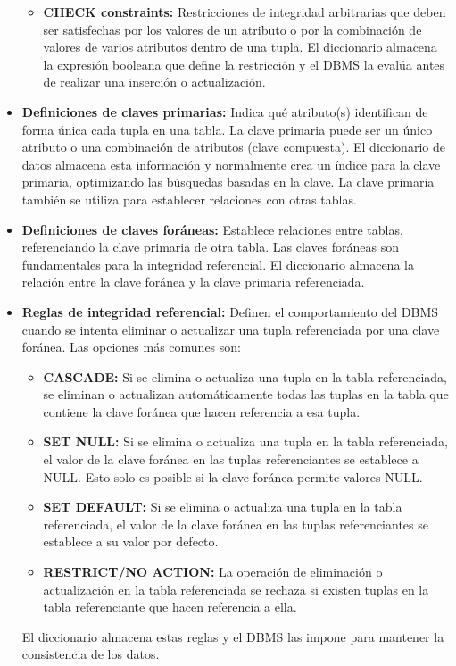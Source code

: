 \begin{itemize}
\begin{itemize}
        \item \textbf{CHECK constraints:} Restricciones de integridad arbitrarias que deben ser satisfechas por los valores de un atributo o por la combinación de valores de varios atributos dentro de una tupla. El diccionario almacena la expresión booleana que define la restricción y el DBMS la evalúa antes de realizar una inserción o actualización.
    \end{itemize}

    \item \textbf{Definiciones de claves primarias:} Indica qué atributo(s) identifican de forma única cada tupla en una tabla. La clave primaria puede ser un único atributo o una combinación de atributos (clave compuesta).  El diccionario de datos almacena esta información y normalmente crea un índice para la clave primaria, optimizando las búsquedas basadas en la clave.  La clave primaria también se utiliza para establecer relaciones con otras tablas.

    \item \textbf{Definiciones de claves foráneas:}  Establece relaciones entre tablas, referenciando la clave primaria de otra tabla. Las claves foráneas son fundamentales para la integridad referencial. El diccionario almacena la relación entre la clave foránea y la clave primaria referenciada.

    \item \textbf{Reglas de integridad referencial:}  Definen el comportamiento del DBMS cuando se intenta eliminar o actualizar una tupla referenciada por una clave foránea. Las opciones más comunes son:
    \begin{itemize}
        \item \textbf{CASCADE:}  Si se elimina o actualiza una tupla en la tabla referenciada, se eliminan o actualizan automáticamente todas las tuplas en la tabla que contiene la clave foránea que hacen referencia a esa tupla.
        \item \textbf{SET NULL:}  Si se elimina o actualiza una tupla en la tabla referenciada, el valor de la clave foránea en las tuplas referenciantes se establece a NULL.  Esto solo es posible si la clave foránea permite valores NULL.
        \item \textbf{SET DEFAULT:}  Si se elimina o actualiza una tupla en la tabla referenciada, el valor de la clave foránea en las tuplas referenciantes se establece a su valor por defecto.
        \item \textbf{RESTRICT/NO ACTION:}  La operación de eliminación o actualización en la tabla referenciada se rechaza si existen tuplas en la tabla referenciante que hacen referencia a ella.
    \end{itemize}
    El diccionario almacena estas reglas y el DBMS las impone para mantener la consistencia de los datos.


\end{itemize}
